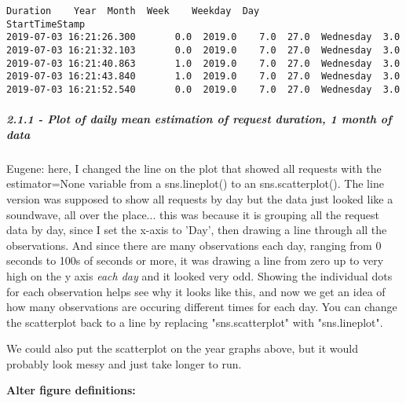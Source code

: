 \documentclass[11pt]{article}
\makeatletter
\newcommand{\boxspacing}{\kern\kvtcb@left@rule\kern\kvtcb@boxsep}
\newcommand{\prompt}[4]{
        \ttfamily\llap{{\color{#2}[#3]:\hspace{3pt}#4}}\vspace{-\baselineskip}
    }
\makeatother
\begin{document}
            \begin{tcolorbox}[breakable, size=fbox, boxrule=.5pt, pad at break*=1mm, opacityfill=0]
\prompt{Out}{outcolor}{391}{\boxspacing}
\begin{Verbatim}[commandchars=\\\{\}]
                         Duration    Year  Month  Week    Weekday  Day
StartTimeStamp
2019-07-03 16:21:26.300       0.0  2019.0    7.0  27.0  Wednesday  3.0
2019-07-03 16:21:32.103       0.0  2019.0    7.0  27.0  Wednesday  3.0
2019-07-03 16:21:40.863       1.0  2019.0    7.0  27.0  Wednesday  3.0
2019-07-03 16:21:43.840       1.0  2019.0    7.0  27.0  Wednesday  3.0
2019-07-03 16:21:52.540       0.0  2019.0    7.0  27.0  Wednesday  3.0
\end{Verbatim}
\end{tcolorbox}
        
    \subparagraph{2.1.1 - Plot of daily mean estimation of request duration,
1 month of
data}\label{plot-of-daily-mean-estimation-of-request-duration-1-month-of-data}

    Eugene: here, I changed the line on the plot that showed all requests
with the estimator=None variable from a sns.lineplot() to an
sns.scatterplot(). The line version was supposed to show all requests by
day but the data just looked like a soundwave, all over the place...
this was because it is grouping all the request data by day, since I set
the x-axis to 'Day', then drawing a line through all the observations.
And since there are many observations each day, ranging from 0 seconds
to 100s of seconds or more, it was drawing a line from zero up to very
high on the y axis \emph{each day} and it looked very odd. Showing the
individual dots for each observation helps see why it looks like this,
and now we get an idea of how many observations are occuring different
times for each day. You can change the scatterplot back to a line by
replacing "sns.scatterplot" with "sns.lineplot".

We could also put the scatterplot on the year graphs above, but it would
probably look messy and just take longer to run.

    \textbf{Alter figure definitions:}
\end{document}
